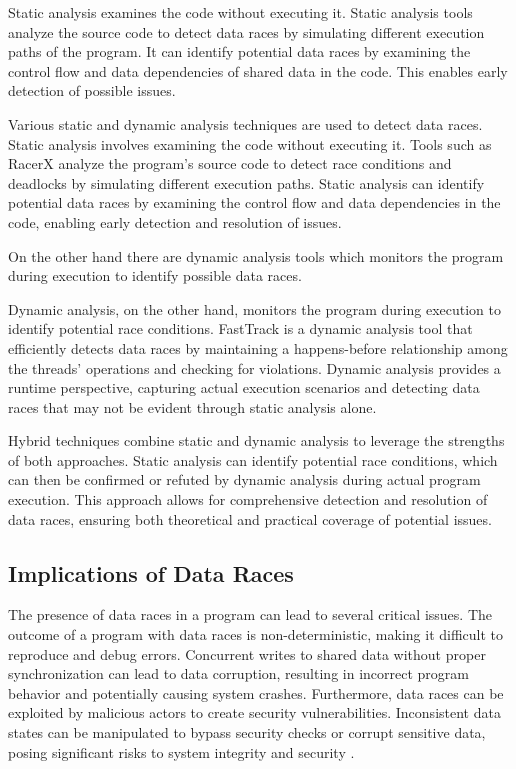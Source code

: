 \documentclass[
fancyheadings, %
%
%
]{stsreprt}
\begin{document}
{Static analysis examines the code without executing it. Static analysis tools analyze the source code to detect data races by simulating different execution paths of the program. It can identify potential data races by examining the control flow  and data dependencies of shared data in the code. This enables early detection of possible issues.

Various static and dynamic analysis techniques are used to detect data races. Static analysis involves examining the code without executing it. Tools such as RacerX \cite{engler2003} analyze the program's source code to detect race conditions and deadlocks by simulating different execution paths. Static analysis can identify potential data races by examining the control flow and data dependencies in the code, enabling early detection and resolution of issues.

On the other hand there are dynamic analysis tools which monitors the program during execution to identify possible data races.

Dynamic analysis, on the other hand, monitors the program during execution to identify potential race conditions. FastTrack \cite{flanagan2009} is a dynamic analysis tool that efficiently detects data races by maintaining a happens-before relationship among the threads' operations and checking for violations. Dynamic analysis provides a runtime perspective, capturing actual execution scenarios and detecting data races that may not be evident through static analysis alone.

Hybrid techniques combine static and dynamic analysis to leverage the strengths of both approaches. Static analysis can identify potential race conditions, which can then be confirmed or refuted by dynamic analysis during actual program execution. This approach allows for comprehensive detection and resolution of data races, ensuring both theoretical and practical coverage of potential issues.

\subsection{Implications of Data Races}

The presence of data races in a program can lead to several critical issues. The outcome of a program with data races is non-deterministic, making it difficult to reproduce and debug errors. Concurrent writes to shared data without proper synchronization can lead to data corruption, resulting in incorrect program behavior and potentially causing system crashes. Furthermore, data races can be exploited by malicious actors to create security vulnerabilities. Inconsistent data states can be manipulated to bypass security checks or corrupt sensitive data, posing significant risks to system integrity and security \cite{adve1996}.

}
\end{document}
